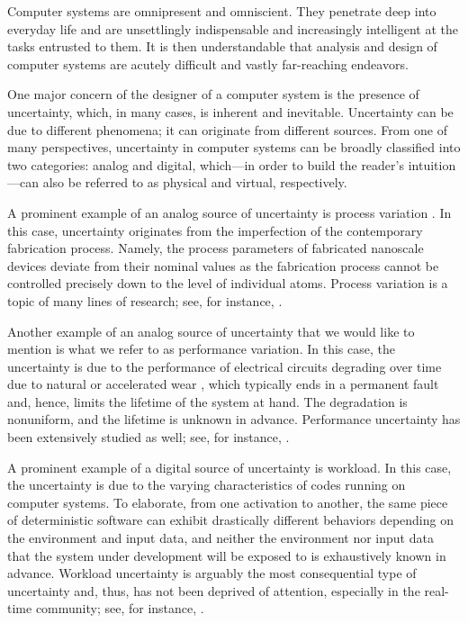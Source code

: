 Computer systems are omnipresent and omniscient. They penetrate deep into
everyday life and are unsettlingly indispensable and increasingly intelligent at
the tasks entrusted to them. It is then understandable that analysis and design
of computer systems are acutely difficult and vastly far-reaching endeavors.

One major concern of the designer of a computer system is the presence of
uncertainty, which, in many cases, is inherent and inevitable. Uncertainty can
be due to different phenomena; it can originate from different sources. From one
of many perspectives, uncertainty in computer systems can be broadly classified
into two categories: analog and digital, which---in order to build the reader's
intuition---can also be referred to as physical and virtual, respectively.

A prominent example of an analog source of uncertainty is process variation
\cite{srivastava2010}. In this case, uncertainty originates from the
imperfection of the contemporary fabrication process. Namely, the process
parameters of fabricated nanoscale devices deviate from their nominal values as
the fabrication process cannot be controlled precisely down to the level of
individual atoms. Process variation is a topic of many lines of research; see,
for instance, \cite{bhardwaj2006, bhardwaj2008, chandra2010, juan2012, lee2013}.

Another example of an analog source of uncertainty that we would like to mention
is what we refer to as performance variation. In this case, the uncertainty is
due to the performance of electrical circuits degrading over time due to natural
or accelerated wear \cite{jedec2016}, which typically ends in a permanent fault
and, hence, limits the lifetime of the system at hand. The degradation is
nonuniform, and the lifetime is unknown in advance. Performance uncertainty has
been extensively studied as well; see, for instance, \cite{coskun2006,
huang2009b, das2014c}.

A prominent example of a digital source of uncertainty is workload. In this
case, the uncertainty is due to the varying characteristics of codes running on
computer systems. To elaborate, from one activation to another, the same piece
of deterministic software can exhibit drastically different behaviors depending
on the environment and input data, and neither the environment nor input data
that the system under development will be exposed to is exhaustively known in
advance. Workload uncertainty is arguably the most consequential type of
uncertainty and, thus, has not been deprived of attention, especially in the
real-time community; see, for instance, \cite{diaz2002, santinelli2011,
quinton2012, tanasa2015}.

